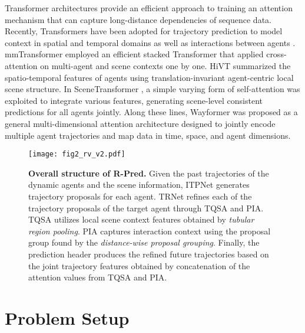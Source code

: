 \documentclass[10pt,twocolumn,letterpaper]{article}
\begin{document}
Transformer architectures provide an efficient approach to training an attention mechanism that can capture long-distance dependencies of sequence data. Recently, Transformers have been adopted for trajectory prediction to model context in spatial and temporal domains as well as interactions between agents \cite{Agentformer, LTP, HiVT, mmTransformer, Wayformer, Scenetransformer}. 
mmTransformer \cite{mmTransformer} employed an efficient stacked Transformer that applied cross-attention on  multi-agent and scene contexts one by one.   HiVT \cite{HiVT} summarized the spatio-temporal features of agents using translation-invariant  agent-centric local scene structure. In SceneTransformer \cite{Scenetransformer}, a simple varying form of self-attention was exploited to integrate various features, generating scene-level consistent predictions for all agents jointly. Along these lines, Wayformer \cite{Wayformer} was proposed as a general multi-dimensional attention architecture designed to jointly encode multiple agent trajectories and map data in time, space, and agent dimensions. 

\begin{figure*}[t]
\centering  
\texttt{[image: fig2\_rv\_v2.pdf]}
\caption{\textbf{Overall structure of R-Pred.} Given the past trajectories of the dynamic agents and the scene information,  ITPNet generates  trajectory proposals for each agent. TRNet refines each of the  trajectory proposals of the target agent through TQSA and PIA.  TQSA utilizes local scene context features obtained by {\it tubular region pooling}. PIA captures interaction context using the proposal group found by the {\it distance-wise proposal grouping}. Finally, the  prediction header produces the refined future trajectories based on the joint trajectory features obtained by concatenation of the attention values from TQSA and PIA. }
\label{overall framework}  
\end{figure*}

\section{Problem Setup}
\end{document}
